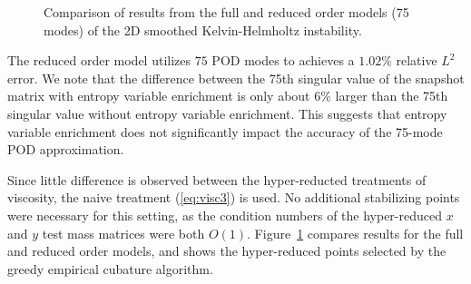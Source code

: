 \documentclass[preprint,10pt]{elsarticle}
\theoremstyle{definition}
\theoremstyle{lemma}
\theoremstyle{theorem}
\theoremstyle{assumption}
\newcommand{\note}[1]{{\color{blue}{#1}}}
\begin{document}
\begin{figure}
\centering
{}
\hspace{.175em}
\hspace{.1em}
\caption{Comparison of results from the full and reduced order models (75 modes) of the 2D smoothed Kelvin-Helmholtz instability.}
\label{fig:khrom}
\end{figure}
The reduced order model utilizes $75$ POD modes to achieves a $1.02\%$ relative $L^2$ error.  We note that the difference between the 75th singular value of the snapshot matrix with entropy variable enrichment is only about $6\%$ larger than the 75th singular value without entropy variable enrichment.  This suggests that entropy variable enrichment does not significantly impact the accuracy of the 75-mode POD approximation.  

Since little difference is observed between the hyper-reducted treatments of viscosity, the naive treatment (\ref{eq:visc3}) is used.  No additional stabilizing points were necessary for this setting, as the condition numbers of the hyper-reduced $x$ and $y$ test mass matrices were both $O(1)$.  Figure~\ref{fig:khrom} compares results for the full and reduced order models, and shows the hyper-reduced points selected by the greedy empirical cubature algorithm.  
\end{document}

